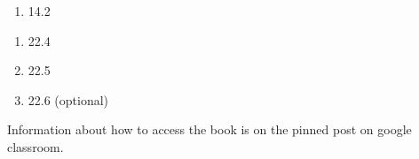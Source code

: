 \documentclass[12pt]{article}
\begin{document}
\begin{enumerate}
  \setlength{\itemsep}{-1mm}
\item 14.2
\end{enumerate}

\begin{enumerate}
  \setlength{\itemsep}{-1mm}
\item 22.4
\item 22.5
  \item 22.6 (optional)\\
\end{enumerate}



\noindent Information about how to access the book is on the
pinned post on google classroom. 
\end{document}
